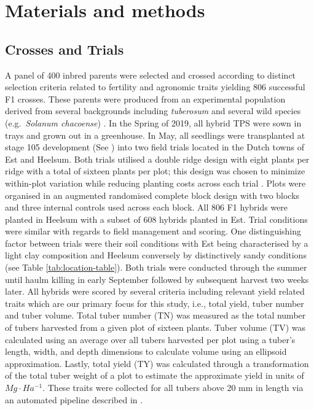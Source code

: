 \section{Materials and methods}
\label{sec:materials:methods}

\subsection{Crosses and Trials}

A panel of 400 inbred parents were selected and crossed according to distinct selection criteria related to fertility and agronomic traits yielding 806 successful F1 crosses. These parents were produced from an experimental population derived from several backgrounds including \emph{tuberosum} and several wild species (e.g.~\emph{Solanum chacoense}) \citep{Lindhout2018}. In the Spring of 2019, all hybrid TPS were sown in trays and grown out in a greenhouse. In May, all seedlings were transplanted at stage 105 development (See \citep{Kacheyo2021}) into two field trials located in the Dutch towns of Est and Heelsum. Both trials utilised a double ridge design with eight plants per ridge with a total of sixteen plants per plot; this design was chosen to minimize within-plot variation while reducing planting costs across each trial \citep{Stockem2021}. Plots were organised in an augmented randomised complete block design with two blocks and three internal controls used across each block. All 806 F1 hybrids were planted in Heelsum with a subset of 608 hybrids planted in Est. Trial conditions were similar with regards to field management and scoring. One distinguishing factor between trials were their soil conditions with Est being characterised by a light clay composition and Heelsum conversely by distinctively sandy conditions (see Table \ref{tab:location-table}). Both trials were conducted through the summer until haulm killing in early September followed by subsequent harvest two weeks later. All hybrids were scored by several criteria including relevant yield related traits which are our primary focus for this study, i.e., total yield, tuber number and tuber volume. Total tuber number (TN) was measured as the total number of tubers harvested from a given plot of sixteen plants. Tuber volume (TV) was calculated using an average over all tubers harvested per plot using a tuber's length, width, and depth dimensions to calculate volume using an ellipsoid approximation. Lastly, total yield (TY) was calculated through a transformation of the total tuber weight of a plot to estimate the approximate yield in units of \(Mg \cdot Ha^{-1}\). These traits were collected for all tubers above 20 mm in length via an automated pipeline described in \citep{Stockem2020}.

